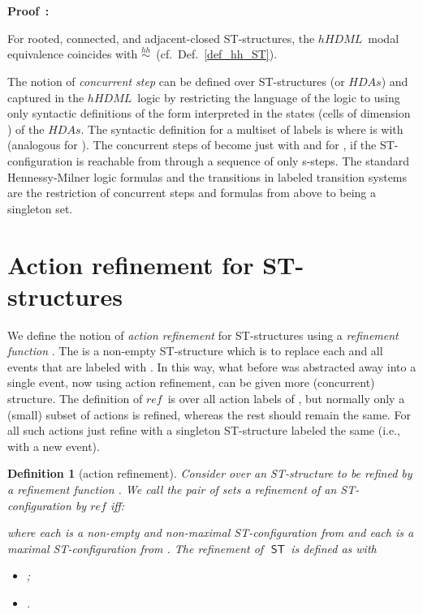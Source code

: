 \documentclass[submission,copyright,creativecommons]{eptcs}
\newtheorem{definition}[theorem]{Definition}
\newenvironment{proof}[1][\!\!\,]{\vspace{1ex}\noindent\textbf{Proof #1: }}{\hfill\vspace{2ex}}
\newcommand\hHDML{\ensuremath{\mathit{hHDML}}}
\newcommand\HDAs{\ensuremath{\mathit{HDAs}}}
\newcommand\ST{\ensuremath{\mathsf{ST}}}
\newcommand\reffun{\ensuremath{\mathit{ref}}}
\newcommand\hhequiv{\ensuremath{\stackrel{hh}{\sim}}}
\begin{document}
{{\begin{proof}
\end{proof}

For rooted, connected, and adjacent-closed ST-structures, the \hHDML\ modal equivalence coincides with \hhequiv\ (cf.~Def.~\ref{def_hh_ST}).


The notion of \textit{concurrent step} \cite[def.7.1]{GlabbeekG01refinement} can be defined over ST-structures (or \HDAs) and captured in the \hHDML\ logic by restricting the language of the logic to using only syntactic definitions of the form  interpreted in the states (cells of dimension ) of the \HDAs. The syntactic definition for a multiset of labels  is  where  is  with  (analogous for ). The concurrent steps of \cite[def.7.1]{GlabbeekG01refinement} become just  with  and  for , if the ST-configuration  is reachable from  through a sequence of only s-steps. The standard Hennessy-Milner logic formulas and the transitions in labeled transition systems are the restriction of concurrent steps and formulas from above to  being a singleton set.

}

}





\section{Action refinement for ST-structures}\label{subsec_actref}

We define the notion of \textit{action refinement} \cite{GlabbeekG01refinement} for ST-structures  using a \textit{refinement function} . The  is a non-empty ST-structure which is to replace each and all events that are labeled with . In this way, what before was abstracted away into a single event, now using action refinement, can be given more (concurrent) structure. The definition of \reffun\ is over all action labels of , but normally only a (small) subset of actions is refined, whereas the rest should remain the same. For all such actions just refine with a singleton ST-structure labeled the same 
(i.e.,  with  a new event).

\begin{definition}[action refinement]\label{def_actref}
Consider  over  an \emph{ST-structure to be refined} by a \emph{refinement function} . We call the pair of sets  \emph{a refinement of an ST-config\-uration  by \reffun} iff:

where each  is a non-empty and non-maximal ST-configuration from  and each  is a maximal ST-configuration from .
The refinement of\,\ \ST\ is defined as  with
\begin{itemize}
\item ;
\item .
\end{itemize}
\end{definition}
\end{document}
